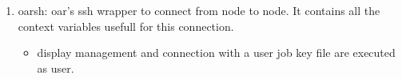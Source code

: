 \documentclass[a4paper,10pt]{article}
\begin{document}
\begin{enumerate}
 \item oarsh:
	oar's ssh wrapper to connect from node to node. It contains all the context variables usefull for this connection.
	\begin{itemize}
 		\item display management and connection with a user job key file are executed as user.
	\end{itemize}

\end{enumerate}
\end{document}
